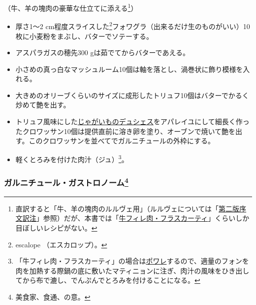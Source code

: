 \begin{recette}


（牛、羊の塊肉の豪華な仕立てに添える\footnote{直訳すると「牛、羊の塊肉のルルヴェ用」（ルルヴェについては「\protect\hyperlink{releve}{第二版序文訳注}」参照）だが、本書では「\protect\hyperlink{filet-de-boeur-frascati}{牛フィレ肉・フラスカーティ}」くらいしか目ぼしいレシピがない。}）

\begin{itemize}
\item
  厚さ1〜2 cm程度スライスした\footnote{escalope （エスカロップ）。}フォワグラ（出来るだけ生のものがいい）10枚に小麦粉をまぶし、バターでソテーする。
\item
  アスパラガスの穂先300 gは茹でてからバターであえる。
\item
  小さめの真っ白なマッシュルーム10個は軸を落とし、渦巻状に飾り模様を入れる。
\item
  大きめのオリーブくらいのサイズに成形したトリュフ10個はバターでかるく炒めて艶を出す。
\item
  トリュフ風味にした\protect\hyperlink{pommes-de-terre-duchesse}{じゃがいものデュシェス}をアパレイユにして細長く作ったクロワッサン10個は提供直前に溶き卵を塗り、オーブンで焼いて艶を出す。このクロワッサンを並べてでガルニチュールの外枠にする。
\item
  軽くとろみを付けた肉汁（ジュ）\footnote{「牛フィレ肉・フラスカーティ」の場合は\protect\hyperlink{les-poeles}{ポワレ}するので、適量のフォンを肉を加熱する際鍋の底に敷いたマティニョンに注ぎ、肉汁の風味をひき出してから布で漉し、でんぷんでとろみを付けることになる。}。
\end{itemize}

\hypertarget{garniture-a-la-gastronome}{%
\subsubsection[ガルニチュール・ガストロノーム]{\texorpdfstring{ガルニチュール・ガストロノーム\footnote{美食家、食通、の意。}}{ガルニチュール・ガストロノーム}}\label{garniture-a-la-gastronome}}




\end{recette}

